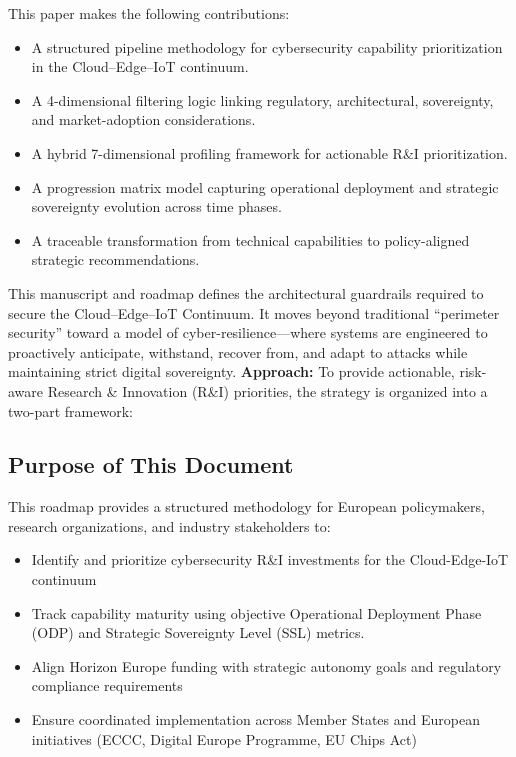 \documentclass{ieeeaccess}
\begin{document}
This paper makes the following contributions:
\begin{itemize}
    \item A structured pipeline methodology for cybersecurity capability prioritization in the Cloud--Edge--IoT continuum.
    \item A 4-dimensional filtering logic linking regulatory, architectural, sovereignty, and market-adoption considerations.
    \item A hybrid 7-dimensional profiling framework for actionable R\&I prioritization.
    \item A progression matrix model capturing operational deployment and strategic sovereignty evolution across time phases.
    \item A traceable transformation from technical capabilities to policy-aligned strategic recommendations.
\end{itemize}
\newpage

\noindent
This manuscript and roadmap defines the architectural guardrails required to secure the Cloud--Edge--IoT Continuum. It moves beyond traditional ``perimeter security'' toward a model of cyber-resilience---where systems are engineered to proactively anticipate, withstand, recover from, and adapt to attacks while maintaining strict digital sovereignty.
\textbf{Approach:} To provide actionable, risk-aware Research \& Innovation (R\&I) priorities, the strategy is organized into a two-part framework:
 

\subsection*{Purpose of This Document}
This roadmap provides a structured methodology for European policymakers, research organizations, and industry stakeholders to:
\begin{itemize}
    \item Identify and prioritize cybersecurity R\&I investments for the Cloud-Edge-IoT continuum
\item Track capability maturity using objective Operational Deployment Phase (ODP) and Strategic Sovereignty Level (SSL) metrics.
    \item Align Horizon Europe funding with strategic autonomy goals and regulatory compliance requirements
    \item Ensure coordinated implementation across Member States and European initiatives (ECCC, Digital Europe Programme, EU Chips Act)
\end{itemize}
\end{document}
